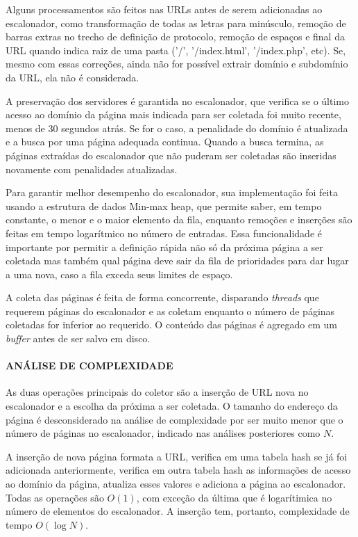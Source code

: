 \documentclass[paper=a4, fontsize=11pt]{scrartcl}
\numberwithin{equation}{section}		%
\numberwithin{figure}{section}			%
\numberwithin{table}{section}				%
\begin{document}
Alguns processamentos são feitos nas URLs antes de serem adicionadas ao escalonador, como transformação de todas as letras para minúsculo, remoção de barras extras no trecho de definição de protocolo, remoção de espaços e final da URL quando indica raiz de uma pasta ('/', '/index.html', '/index.php', etc). Se, mesmo com essas correções, ainda não for possível extrair domínio e subdomínio da URL, ela não é considerada.

A preservação dos servidores é garantida no escalonador, que verifica se o último acesso ao domínio da página mais indicada para ser coletada foi muito recente, menos de 30 segundos atrás. Se for o caso, a penalidade do domínio é atualizada e a busca por uma página adequada continua. Quando a busca termina, as páginas extraídas do escalonador que não puderam ser coletadas são inseridas novamente com penalidades atualizadas.

Para garantir melhor desempenho do escalonador, sua implementação foi feita usando a estrutura de dados Min-max heap, que permite saber, em tempo constante, o menor e o maior elemento da fila, enquanto remoções e inserções são feitas em tempo logarítmico no número de entradas. Essa funcionalidade é importante por permitir a definição rápida não só da próxima página a ser coletada mas também qual página deve sair da fila de prioridades para dar lugar a uma nova, caso a fila exceda seus limites de espaço.

A coleta das páginas é feita de forma concorrente, disparando \textit{threads} que requerem páginas do escalonador e as coletam enquanto o número de páginas coletadas for inferior ao requerido. O conteúdo das páginas é agregado em um \textit{buffer} antes de ser salvo em disco. 

\paragraph{\textbf{ANÁLISE DE COMPLEXIDADE}} As duas operações principais do coletor são a inserção de URL nova no escalonador e a escolha da próxima a ser coletada. O tamanho do endereço da página é desconsiderado na análise de complexidade por ser muito menor que o número de páginas no escalonador, indicado nas análises posteriores como $N$.

A inserção de nova página formata a URL, verifica em uma tabela hash se já foi adicionada anteriormente, verifica em outra tabela hash as informações de acesso ao domínio da página, atualiza esses valores e adiciona a página ao escalonador. Todas as operações são $O(1)$, com exceção da última que é logarítimica no número de elementos do escalonador. A inserção tem, portanto, complexidade de tempo $O(\log N)$. 
\end{document}
